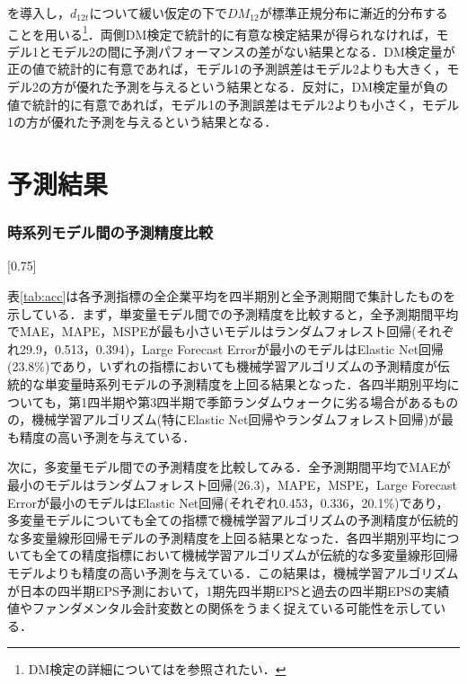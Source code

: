 \documentclass[a4paper，12pt]{jsarticle}
\begin{document}
\noindent
を導入し，$d_{12t}$について緩い仮定の下で$DM_{12}$が標準正規分布に漸近的分布することを用いる\footnote{DM検定の詳細については\cite{diebold2002comparing}を参照されたい．}．両側DM検定で統計的に有意な検定結果が得られなければ，モデル1とモデル2の間に予測パフォーマンスの差がない結果となる．DM検定量が正の値で統計的に有意であれば，モデル1の予測誤差はモデル2よりも大きく，モデル2の方が優れた予測を与えるという結果となる．反対に，DM検定量が負の値で統計的に有意であれば，モデル1の予測誤差はモデル2よりも小さく，モデル1の方が優れた予測を与えるという結果となる．

\part{予測結果} \label{par:result}

\section{時系列モデル間の予測精度比較}

\begin{landscape}
\begin{table}
  \caption{時系列モデルによる1期先四半期EPS予測の精度(1,003社平均)}
  \label{tab:acc}
  \scalebox{0.75}[0.75]{
    
  }
\end{table}
\end{landscape}

表\ref{tab:acc}は各予測指標の全企業平均を四半期別と全予測期間で集計したものを示している．まず，単変量モデル間での予測精度を比較すると，全予測期間平均でMAE，MAPE，MSPEが最も小さいモデルはランダムフォレスト回帰(それぞれ29.9，0.513，0.394)，Large Forecast Errorが最小のモデルはElastic Net回帰(23.8\%)であり，いずれの指標においても機械学習アルゴリズムの予測精度が伝統的な単変量時系列モデルの予測精度を上回る結果となった．各四半期別平均についても，第1四半期や第3四半期で季節ランダムウォークに劣る場合があるものの，機械学習アルゴリズム(特にElastic Net回帰やランダムフォレスト回帰)が最も精度の高い予測を与えている．

次に，多変量モデル間での予測精度を比較してみる．全予測期間平均でMAEが最小のモデルはランダムフォレスト回帰(26.3)，MAPE，MSPE，Large Forecast Errorが最小のモデルはElastic Net回帰(それぞれ0.453，0.336，20.1\%)であり，多変量モデルについても全ての指標で機械学習アルゴリズムの予測精度が伝統的な多変量線形回帰モデルの予測精度を上回る結果となった．各四半期別平均についても全ての精度指標において機械学習アルゴリズムが伝統的な多変量線形回帰モデルよりも精度の高い予測を与えている．この結果は，機械学習アルゴリズムが日本の四半期EPS予測において，1期先四半期EPSと過去の四半期EPSの実績値やファンダメンタル会計変数との関係をうまく捉えている可能性を示している．
\end{document}
